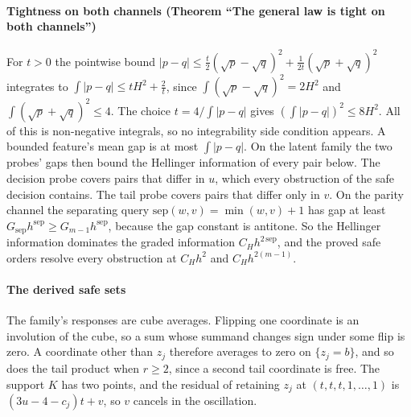 \paragraph{Tightness on both channels (Theorem ``The general law is tight on both channels'')} For
$t>0$ the pointwise bound
$|p-q|\le\frac t2(\sqrt p-\sqrt q)^{2}+\frac1{2t}(\sqrt p+\sqrt q)^{2}$ integrates to
$\int|p-q|\le tH^{2}+\frac2t$, since $\int(\sqrt p-\sqrt q)^{2}=2H^{2}$ and
$\int(\sqrt p+\sqrt q)^{2}\le4$. The choice $t=4/\int|p-q|$ gives $(\int|p-q|)^{2}\le8H^{2}$. All of this
is non-negative integrals, so no integrability side condition appears. A bounded feature's mean
gap is at most $\int|p-q|$. On the latent family the two probes' gaps then bound the Hellinger
information of every pair below. The decision probe covers pairs that differ in $u$, which every
obstruction of the safe decision contains. The tail probe covers pairs that differ only in $v$. On
the parity channel the separating query $\mathrm{sep}(w,v)=\min(w,v)+1$ has gap at least
$G_{\mathrm{sep}}h^{\mathrm{sep}}\ge G_{m-1}h^{\mathrm{sep}}$, because the gap constant is antitone. So the
Hellinger information dominates the graded information $C_{H}h^{2\,\mathrm{sep}}$, and the proved safe
orders resolve every obstruction at $C_{H}h^{2}$ and $C_{H}h^{2(m-1)}$.


\paragraph{The derived safe sets} The family's responses are cube averages. Flipping one
coordinate is an involution of the cube, so a sum whose summand changes sign under some flip is
zero. A coordinate other than $z_{j}$ therefore averages to zero on $\{z_{j}=b\}$, and so does the
tail product when $r\ge2$, since a second tail coordinate is free. The support $K$ has two points,
and the residual of retaining $z_{j}$ at $(t,t,t,1,\dots,1)$ is $(3u-4-c_{j})t+v$, so $v$ cancels in the
oscillation.



